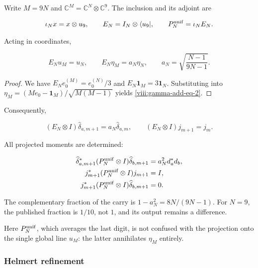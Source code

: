Write \(M=9N\) and \(\mathbb C^M=\mathbb C^N\otimes\mathbb C^9\). The inclusion and its adjoint are

\begin{equation}
\iota_Nx=x\otimes u_9,\qquad
E_N=I_N\otimes\langle u_9|,\qquad P_N^{\rm unif}=\iota_NE_N.
\label{viii:gamma-add-display-8}
\end{equation}

Acting in coordinates,

\begin{equation}
E_Nu_M=u_N,\qquad
E_N\eta_M=a_N\eta_N,\qquad
a_N=\sqrt{\frac{N-1}{9N-1}}.
\label{viii:gamma-add-eq-2}
\end{equation}

\begin{proof}
We have \(E_Ne_0^{(M)}=e_0^{(N)}/3\) and \(E_N\mathbf1_M=3\mathbf1_N\).
Substituting into \(\eta_M=(Me_0-\mathbf1_M)/\sqrt{M(M-1)}\)
yields \eqref{viii:gamma-add-eq-2}.
\end{proof}

Consequently,

\begin{equation}
(E_N\otimes I)\widehat\delta_{a,m+1}=a_N\widehat\delta_{a,m},
\qquad
(E_N\otimes I)j_{m+1}=j_m.
\label{viii:gamma-add-eq-3}
\end{equation}

All projected moments are determined:

\begin{equation}
\begin{aligned}
\widehat\delta_{a,m+1}^*(P_N^{\rm unif}\otimes I)\widehat\delta_{b,m+1}
 &=a_N^2d_a^*d_b,\\
j_{m+1}^*(P_N^{\rm unif}\otimes I)j_{m+1}&=I,\\
j_{m+1}^*(P_N^{\rm unif}\otimes I)\widehat\delta_{b,m+1}&=0.
\end{aligned}
\label{viii:gamma-add-eq-4}
\end{equation}

The complementary fraction of the carry is \(1-a_N^2=8N/(9N-1)\). For \(N=9\), the published fraction is \(1/10\), not \(1\), and its output remains a difference.

Here \(P_N^{\rm unif}\), which averages the last digit, is not confused with the projection onto the single global line \(u_M\): the latter annihilates \(\eta_M\) entirely.

\subsubsection{Helmert refinement}
\label{viii:gamma-add-sub-156}

